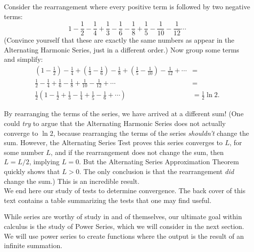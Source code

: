 Consider the rearrangement where every positive term is followed by two negative terms:
$$
1-\frac12-\frac14+\frac13-\frac16-\frac18+\frac15-\frac1{10}-\frac1{12}\cdots
$$
(Convince yourself that these are exactly the same numbers as appear in the Alternating Harmonic Series, just in a different order.) Now group some terms and simplify:
\begin{align*}
\left(1-\frac12\right)-\frac14+\left(\frac13-\frac16\right)-\frac18+\left(\frac15-\frac1{10}\right)-\frac1{12}+\cdots &= \\
\frac12-\frac14+\frac16-\frac18+\frac1{10}-\frac{1}{12}+\cdots &= \\
\frac12\left(1-\frac12+\frac13-\frac14+\frac15-\frac16+\cdots\right) & = \frac12\ln 2.
\end{align*}

By rearranging the terms of the series, we have arrived at a different sum! (One could \textit{try} to argue that the Alternating Harmonic Series does not actually converge to $\ln 2$, because rearranging the terms of the series \emph{shouldn't} change the sum. However, the Alternating Series Test proves this series converges to $L$, for some number $L$, and if the rearrangement does not change the sum, then $L = L/2$, implying $L=0$. But the Alternating Series Approximation Theorem quickly shows that $L>0$. The only conclusion is that the rearrangement \emph{did} change the sum.) This is an incredible result.\\

We end here our study of tests to determine convergence. The back cover of this text contains a table summarizing the tests that one may find useful. 

While series are worthy of study in and of themselves, our ultimate goal within calculus is the study of Power Series, which we will consider in the next section. We will use power series to create functions where the output is the result of an infinite summation. %

